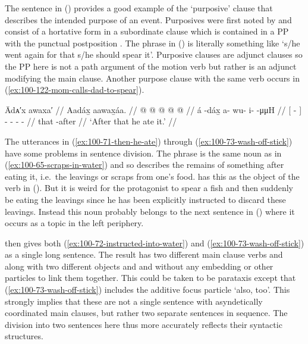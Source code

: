 The sentence in (\lastx) provides a good example of the ‘purposive’ clause that describes the intended purpose of an event.
Purposives were first noted by \textcite[106]{story:1966} and consist of a hortative form in a subordinate clause which is contained in a PP with the punctual postposition .
The phrase  in (\lastx) is literally something like ‘s/he went again for that s/he should spear it’.
Purposive clauses are adjunct clauses so the PP here is not a path argument of the motion verb but rather is an adjunct modifying the main clause.
Another purpose clause with the same verb occurs in (\ref{ex:100-122-mom-calls-dad-to-spear}).

\ex\label{ex:100-71-then-he-ate}%
%
\begingl
	\glpreamble	Ādᴀ′x awaxa′ //
	\glpreamble	Aadáx̱ aawax̱áa. //
	\gla	{}  @ {} {} 
		 @ {} @ {} @ {} @ {} //
	\glb	{} á -dáx̱ {} 
		a- wu- i-  -μμH //
	\glc	{}[  - {}]
		- - -  - //
	\gld	{} that -after {} 
		 {} {} {} {} //
	\glft	‘After that he ate it.’
		//
\endgl
\xe

The utterances in (\ref{ex:100-71-then-he-ate}) through (\ref{ex:100-73-wash-off-stick}) have some problems in sentence division.
The phrase  is the same noun as in (\ref{ex:100-65-scraps-in-water}) and so describes the remains of something after eating it, i.e.\ the leavings or scraps from one’s food.
\citeauthor{swanton:1909} has this as the object of the verb in (\lastx).
But it is weird for the protagonist to spear a fish and then suddenly be eating the leavings since he has been explicitly instructed to discard these leavings.
Instead this noun probably belongs to the next sentence in (\nextx) where it occurs as a topic in the left periphery.

\citeauthor{swanton:1909} then gives both (\ref{ex:100-72-instructed-into-water}) and (\ref{ex:100-73-wash-off-stick}) as a single long sentence.
The result has two different main clause verbs  and  along with two different objects  and  and without any embedding or other particles to link them together.
This could be taken to be parataxis except that (\ref{ex:100-73-wash-off-stick}) includes the additive focus particle  ‘also, too’.
This strongly implies that these are not a single sentence with asyndetically coordinated main clauses, but rather two separate sentences in sequence.
The division into two sentences here thus more accurately reflects their syntactic structures.

